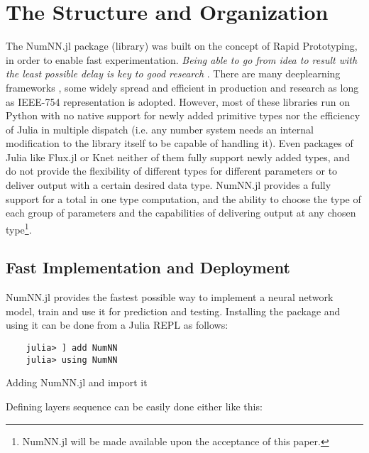 \section{The Structure and Organization}

The NumNN.jl  package%
 (library) was built on the concept of Rapid Prototyping, in order to enable fast experimentation. \emph{Being able to go from idea to result with the least possible delay is key to good research} \cite{Keras}. There are many deeplearning frameworks \cite{Abadi2016,Collet2015,Jia2014,Paszke2017,PyTorch2019}, some widely spread and efficient in production and research as long as IEEE-754 representation is adopted. However, most of these libraries run on Python with no native support for newly added primitive types nor the efficiency of Julia in multiple dispatch (i.e. any number system needs an internal modification to the library itself to be capable of handling it). Even packages of Julia like Flux.jl \cite{Flux.jl-2018,Innes2018} or Knet \cite{Yuret2016k} neither of them fully support newly added types, and do not provide the flexibility of different types for different parameters or to deliver output with a certain desired data type. NumNN.jl provides a fully support for a total in one type computation, and the ability to choose the type of each group of parameters and the capabilities of delivering output at any chosen type\footnote{ NumNN.jl will be made available upon the acceptance  of this paper.}.

\subsection{Fast Implementation and Deployment}

NumNN.jl provides the fastest possible way to implement a neural network model, train and use it for prediction and testing. Installing the package and using it can be done from a Julia REPL as follows:

\begin{listing}[H]
	\begin{verbatim}
	julia> ] add NumNN
	julia> using NumNN
	\end{verbatim}
	\caption{Adding NumNN.jl and import it}\label{addimport}
\end{listing}

Defining layers sequence can be easily done either like this:


